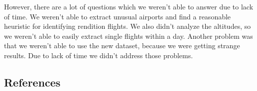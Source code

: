 \documentclass{vldb}
\begin{document}
However, there are a lot of questions which we weren’t 
able to answer due to lack of time. We weren't able to extract 
unusual airports and find a reasonable heuristic for identifying 
rendition flights. We also didn’t analyze the altitudes, so we 
weren’t able to easily extract single flights within a day. 
Another problem was that we weren’t able to use the new 
dataset, because we were getting strange results. 
Due to lack of time we didn’t address those problems.





\subsection{References}
\end{document}
